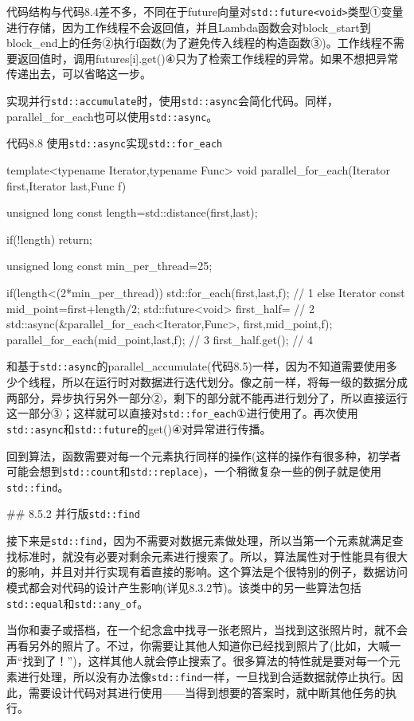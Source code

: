 代码结构与代码8.4差不多，不同在于future向量对\texttt{std::future<void>}类型①变量进行存储，因为工作线程不会返回值，并且Lambda函数会对block\_start到block\_end上的任务②执行f函数(为了避免传入线程的构造函数③)。工作线程不需要返回值时，调用futures[i].get()④只为了检索工作线程的异常。如果不想把异常传递出去，可以省略这一步。

实现并行\texttt{std::accumulate}时，使用\texttt{std::async}会简化代码。同样，parallel\_for\_each也可以使用\texttt{std::async}。

代码8.8 使用\texttt{std::async}实现\texttt{std::for\_each}

\begin{cpp}
template<typename Iterator,typename Func>
void parallel_for_each(Iterator first,Iterator last,Func f)
{
  unsigned long const length=std::distance(first,last);

  if(!length)
    return;

  unsigned long const min_per_thread=25;

  if(length<(2*min_per_thread))
  {
    std::for_each(first,last,f);  // 1
  }
  else
  {
    Iterator const mid_point=first+length/2;
    std::future<void> first_half=  // 2
      std::async(&parallel_for_each<Iterator,Func>,
                 first,mid_point,f);
    parallel_for_each(mid_point,last,f);  // 3
    first_half.get();  // 4
  }
}
\end{cpp}

和基于\texttt{std::async}的parallel\_accumulate(代码8.5)一样，因为不知道需要使用多少个线程，所以在运行时对数据进行迭代划分。像之前一样，将每一级的数据分成两部分，异步执行另外一部分②，剩下的部分就不能再进行划分了，所以直接运行这一部分③；这样就可以直接对\texttt{std::for\_each}①进行使用了。再次使用\texttt{std::async}和\texttt{std::future}的get()④对异常进行传播。

回到算法，函数需要对每一个元素执行同样的操作(这样的操作有很多种，初学者可能会想到\texttt{std::count}和\texttt{std::replace})，一个稍微复杂一些的例子就是使用\texttt{std::find}。

## 8.5.2 并行版\texttt{std::find}

接下来是\texttt{std::find}，因为不需要对数据元素做处理，所以当第一个元素就满足查找标准时，就没有必要对剩余元素进行搜索了。所以，算法属性对于性能具有很大的影响，并且对并行实现有着直接的影响。这个算法是个很特别的例子，数据访问模式都会对代码的设计产生影响(详见8.3.2节)。该类中的另一些算法包括\texttt{std::equal}和\texttt{std::any\_of}。

当你和妻子或搭档，在一个纪念盒中找寻一张老照片，当找到这张照片时，就不会再看另外的照片了。不过，你需要让其他人知道你已经找到照片了(比如，大喊一声“找到了！”)，这样其他人就会停止搜索了。很多算法的特性就是要对每一个元素进行处理，所以没有办法像\texttt{std::find}一样，一旦找到合适数据就停止执行。因此，需要设计代码对其进行使用——当得到想要的答案时，就中断其他任务的执行。

